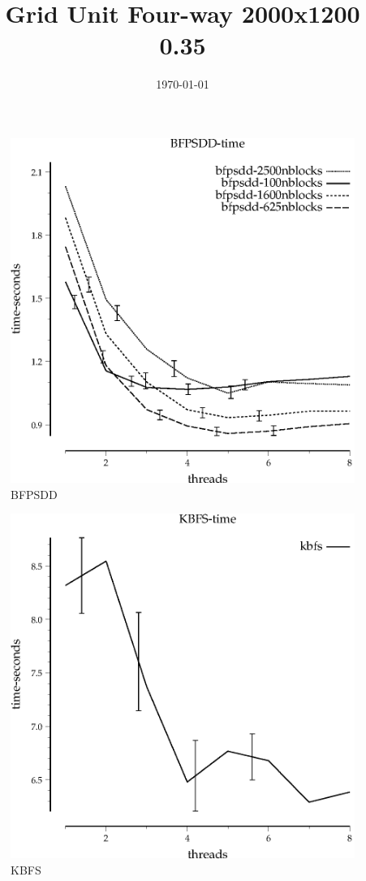 \documentclass{article}
\title{Grid Unit Four-way 2000x1200 0.35}
\date{\today}
\begin{document}
\maketitle

\begin{figure}
\begin{center}
\includegraphics{BFPSDD-time}
\end{center}
\caption{BFPSDD}
\end{figure}


\begin{figure}
\begin{center}
\includegraphics{KBFS-time}
\end{center}
\caption{KBFS}
\end{figure}
\end{document}
